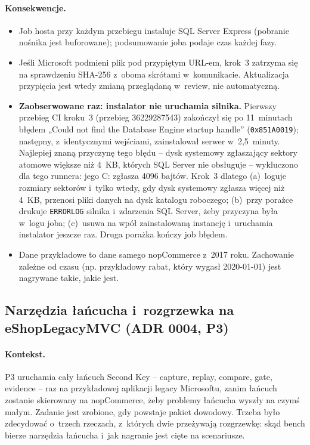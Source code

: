 \paragraph{Konsekwencje.}
\begin{itemize}
  \item Job hosta przy każdym przebiegu instaluje SQL Server Express (pobranie nośnika jest
    buforowane); podsumowanie joba podaje czas każdej fazy.
  \item Jeśli Microsoft podmieni plik pod przypiętym URL-em, krok~3 zatrzyma się na
    sprawdzeniu SHA-256 z~oboma skrótami w~komunikacie. Aktualizacja przypięcia jest
    wtedy zmianą przeglądaną w~review, nie automatyczną.
  \item \textbf{Zaobserwowane raz: instalator nie uruchamia silnika.} Pierwszy przebieg CI
    kroku~3 (przebieg 36229287543) zakończył się po 11~minutach błędem
    „Could not find the Database Engine startup handle” (\texttt{0x851A0019}); następny,
    z~identycznymi wejściami, zainstalował serwer w~2,5~minuty. Najlepiej znaną przyczynę
    tego błędu -- dysk systemowy zgłaszający sektory atomowe większe niż 4~KB, których SQL
    Server nie obsługuje -- wykluczono dla tego runnera: jego C: zgłasza 4096 bajtów.
    Krok~3 dlatego (a)~loguje rozmiary sektorów i~tylko wtedy, gdy dysk systemowy zgłasza
    więcej niż 4~KB, przenosi pliki danych na dysk katalogu roboczego; (b)~przy porażce
    drukuje \texttt{ERRORLOG} silnika i~zdarzenia SQL Server, żeby przyczyna była w~logu
    joba; (c)~usuwa na wpół zainstalowaną instancję i~uruchamia instalator jeszcze raz.
    Druga porażka kończy job błędem.
  \item Dane przykładowe to dane samego nopCommerce z~2017 roku. Zachowanie zależne od
    czasu (np. przykładowy rabat, który wygasł 2020-01-01) jest nagrywane takie, jakie
    jest.
\end{itemize}


\subsection{Narzędzia łańcucha i~rozgrzewka na eShopLegacyMVC (ADR 0004, P3)}\label{sec:bench-rozgrzewka}

\paragraph{Kontekst.} P3 uruchamia cały łańcuch Second Key -- capture, replay, compare,
gate, evidence -- raz na przykładowej aplikacji legacy Microsoftu, zanim łańcuch zostanie
skierowany na nopCommerce, żeby problemy łańcucha wyszły na czymś małym. Zadanie jest
zrobione, gdy powstaje pakiet dowodowy. Trzeba było zdecydować o~trzech rzeczach, z~których
dwie przeżywają rozgrzewkę: skąd bench bierze narzędzia łańcucha i~jak nagranie jest
cięte na scenariusze.

